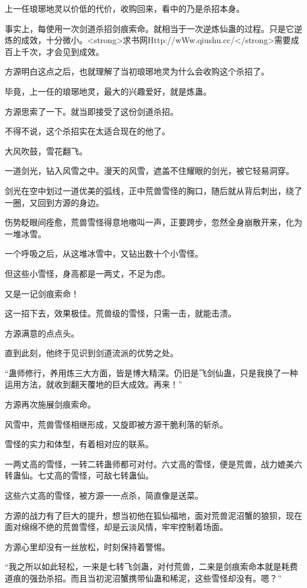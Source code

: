 \begin{this_body}
上一任琅琊地灵以价低的代价，收购回来，看中的乃是杀招本身。

事实上，每使用一次剑道杀招剑痕索命。就相当于一次逆炼仙蛊的过程。只是它逆炼的成效，十分微小。<strong>求书网Http://wWw.qiushu.cc/</strong>需要成百上千次，才会见到成效。

方源明白这点之后，也就理解了当初琅琊地灵为什么会收购这个杀招了。

毕竟，上一任的琅琊地灵，最大的兴趣爱好，就是炼蛊。

方源思索了一下。就当即接受了这份剑道杀招。

不得不说，这个杀招实在太适合现在的他了。

大风吹鼓，雪花翻飞。

一道剑光，钻入风雪之中。漫天的风雪，遮盖不住耀眼的剑光，被它轻易洞穿。

剑光在空中划过一道优美的弧线，正中荒兽雪怪的胸口，随后就从背后刺出，绕了一圈，又回到方源的身边。

伤势眨眼间痊愈，荒兽雪怪得意地嗷叫一声，正要跨步，忽然全身崩散开来，化为一堆冰雪。

一个呼吸之后，从这堆冰雪中，又钻出数十个小雪怪。

但这些小雪怪，身高都是一两丈，不足为虑。

又是一记剑痕索命！

这一招下去，效果极佳。荒兽级的雪怪，只需一击，就能击溃。

方源满意的点点头。

直到此刻，他终于见识到剑道流派的优势之处。

“蛊师修行，养用炼三大方面，皆是博大精深。仍旧是飞剑仙蛊，只是我换了一种运用方法，就收到翻天覆地的巨大成效。再来！”

方源再次施展剑痕索命。

风雪中，荒兽雪怪相继形成，又旋即被方源干脆利落的斩杀。

雪怪的实力和体型，有着相对应的联系。

一两丈高的雪怪，一转二转蛊师都可对付。六丈高的雪怪，便是荒兽，战力媲美六转蛊仙。七丈高的雪怪，可敌七转蛊仙。

这些六丈高的雪怪，被方源一一点杀，简直像是送菜。

方源的战力有了巨大的提升，想当初他在狐仙福地，面对荒兽泥沼蟹的狼狈，现在面对绵绵不绝的荒兽雪怪，却是云淡风情，牢牢控制着场面。

方源心里却没有一丝放松，时刻保持着警惕。

“我之所以如此轻松，一来是七转飞剑蛊，对付荒兽，二来是剑痕索命本就是耗费道痕的强劲杀招。而且当初泥沼蟹携带仙蛊和稀泥，这些雪怪却没有。嗯？”


\end{this_body}
